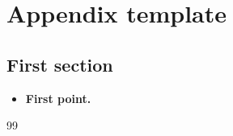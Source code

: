 \chapter{Appendix template}\label{app:template}


\section{First section}\label{sec:app-first}

\begin{gbox*}
\begin{itemize}
  \item \textbf{First point.} 
\end{itemize}
\end{gbox*}

\begin{chapterbib}{99}
 
\end{chapterbib}
